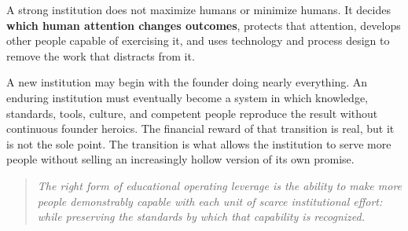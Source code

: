 A strong institution does not maximize humans or minimize humans. It decides \textbf{which human attention changes outcomes}, protects that attention, develops other people capable of exercising it, and uses technology and process design to remove the work that distracts from it.

A new institution may begin with the founder doing nearly everything. An enduring institution must eventually become a system in which knowledge, standards, tools, culture, and competent people reproduce the result without continuous founder heroics. The financial reward of that transition is real, but it is not the sole point. The transition is what allows the institution to serve more people without selling an increasingly hollow version of its own promise.

\begin{quote}
\itshape
The right form of educational operating leverage is the ability to make more people demonstrably capable with each unit of scarce institutional effort: while preserving the standards by which that capability is recognized.
\end{quote}

